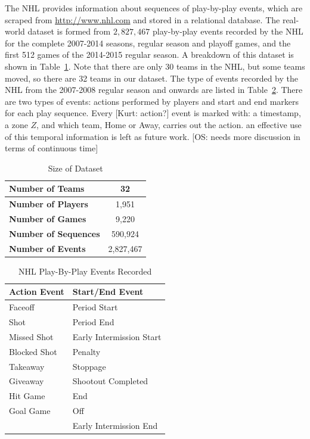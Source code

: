 \documentclass[]{article}
\begin{document}
The NHL provides information about sequences of play-by-play events, which are scraped from \url{http://www.nhl.com} and stored in a relational database. The real-world dataset is formed from $2,827,467$ play-by-play events recorded by the NHL for the complete 2007-2014 seasons, regular season and playoff games, and the first 512 games of the 2014-2015 regular season. A breakdown of this dataset is shown in Table~\ref{table:size-of-dataset}. Note that there are only 30 teams in the NHL, but some teams moved, so there are 32 teams in our dataset.
The type of events recorded by the NHL from the 2007-2008 regular season and onwards are listed in Table~\ref{table:events-recorded}. There are two types of events: actions performed by players and start and end markers for each play sequence. Every [Kurt: action?] event is marked with: a timestamp, a zone $Z$, and which team, Home or Away, carries out the action.
 an effective use of this temporal information is left as future work. [OS: needs more discussion in terms of continuous time]
\begin{table}[htb]
\caption{Size of Dataset}
\label{table:size-of-dataset}
\begin{center}
\begin{tabular}{|l|c|}
\hline
\bf{Number of Teams} & 32 \\ \hline
\bf{Number of Players} & 1,951 \\ \hline
\bf{Number of Games} & 9,220 \\ \hline
\bf{Number of Sequences} & 590,924 \\ \hline
\bf{Number of Events} & 2,827,467 \\ \hline
\end{tabular}
\end{center}
\end{table}

\begin{table}[htb]
\caption{NHL Play-By-Play Events Recorded}
\label{table:events-recorded}
\begin{center}
\begin{tabular}{|l|l|}
\hline
 \bf{Action Event} & \bf{Start/End Event}\\ \hline
Faceoff & Period Start \\\hline
Shot & Period End \\\hline
Missed Shot & Early Intermission Start\\ \hline
Blocked Shot & Penalty\\ \hline
Takeaway & Stoppage\\  \hline
Giveaway & Shootout Completed\\ \hline
Hit Game & End\\ \hline
Goal Game & Off\\ \hline
& Early Intermission End \\
\hline
\end{tabular}
\end{center}
\end{table}
\end{document}
